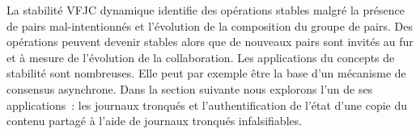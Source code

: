 La stabilité \acl{VFJC} dynamique identifie des opérations stables malgré la présence de pairs mal-intentionnés et l'évolution de la composition du groupe de pairs.
Des opérations peuvent devenir stables alors que de nouveaux pairs sont invités au fur et à mesure de l'évolution de la collaboration.
Les applications du concepts de stabilité sont nombreuses.
Elle peut par exemple être la base d'un mécanisme de consensus asynchrone.
Dans la section suivante nous explorons l'un de ses applications~: les journaux tronqués et l'authentification de l'état d'une copie du contenu partagé à l'aide de journaux tronqués infalsifiables.

%
%
%
%
%
%


